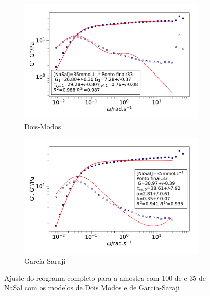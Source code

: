 
	\begin{figure}[h]
		\begin{subfigure}{0.5\textwidth}
			\centering
			\includegraphics[width=\textwidth]{imagens/reologia/ajuste_TM_35}
			\caption{Dois-Modos}
			\label{fig:ajuste_tm_35}
		\end{subfigure} %
		\begin{subfigure}{0.5\textwidth}
			\centering
			\includegraphics[width=\textwidth]{imagens/reologia/ajuste_GS_35}
			\caption{García-Saraji}
			\label{fig:ajuste_gs_35}
		\end{subfigure}
		\caption{Ajuste do reograma completo para a amostra com 100 \mM{} de \CTAB{} e 35 \mM{} de NaSal com os modelos de Dois Modos e de García-Saraji}
		\label{fig:ajuste_gs_tm_35}
	\end{figure}
	
